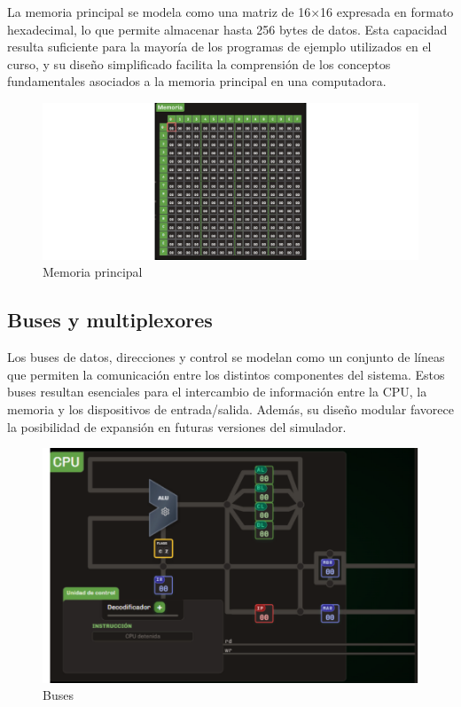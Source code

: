 \documentclass[12pt,oneside]{templates/unerthesis}
\begin{document}
La memoria principal se modela como una matriz de 16×16 expresada en formato hexadecimal, lo que permite almacenar hasta 256 bytes de datos. Esta capacidad resulta suficiente para la mayoría de los programas de ejemplo utilizados en el curso, y su diseño simplificado facilita la comprensión de los conceptos fundamentales asociados a la memoria principal en una computadora.

\begin{figure}

{\centering \includegraphics[width=0.85\linewidth]{images/memoria} 

}

\caption{Memoria principal}\label{fig:memoria}
\end{figure}

\hypertarget{buses-y-multiplexores}{%
\subsection{Buses y multiplexores}\label{buses-y-multiplexores}}

Los buses de datos, direcciones y control se modelan como un conjunto de líneas que permiten la comunicación entre los distintos componentes del sistema. Estos buses resultan esenciales para el intercambio de información entre la CPU, la memoria y los dispositivos de entrada/salida. Además, su diseño modular favorece la posibilidad de expansión en futuras versiones del simulador.

\begin{figure}

{\centering \includegraphics[width=0.85\linewidth]{images/buses} 

}

\caption{Buses}\label{fig:buses}
\end{figure}
\end{document}
